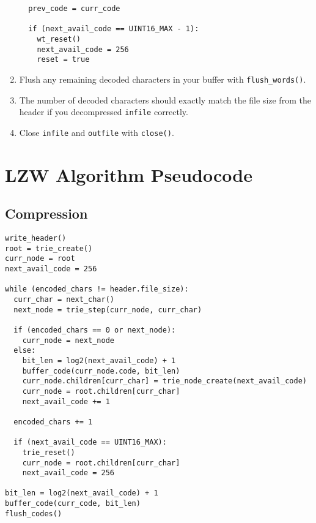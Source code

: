 \documentclass{article}
\begin{document}
\begin{enumerate}
\begin{lstlisting}
  prev_code = curr_code

  if (next_avail_code == UINT16_MAX - 1):
    wt_reset()
    next_avail_code = 256
    reset = true
\end{lstlisting}
    \item Flush any remaining decoded characters in your buffer with
        \texttt{flush\_words()}.
    \item The number of decoded characters should exactly match the file size
        from the header if you decompressed \texttt{infile} correctly.
    \item Close \texttt{infile} and \texttt{outfile} with \texttt{close()}.
\end{enumerate}


\section{LZW Algorithm Pseudocode}

\subsection{Compression}
\begin{lstlisting}
write_header()
root = trie_create()
curr_node = root
next_avail_code = 256

while (encoded_chars != header.file_size):
  curr_char = next_char()
  next_node = trie_step(curr_node, curr_char)

  if (encoded_chars == 0 or next_node):
    curr_node = next_node
  else:
    bit_len = log2(next_avail_code) + 1
    buffer_code(curr_node.code, bit_len)
    curr_node.children[curr_char] = trie_node_create(next_avail_code)
    curr_node = root.children[curr_char]
    next_avail_code += 1

  encoded_chars += 1

  if (next_avail_code == UINT16_MAX):
    trie_reset()
    curr_node = root.children[curr_char]
    next_avail_code = 256

bit_len = log2(next_avail_code) + 1
buffer_code(curr_code, bit_len)
flush_codes()
\end{lstlisting}
\end{document}
